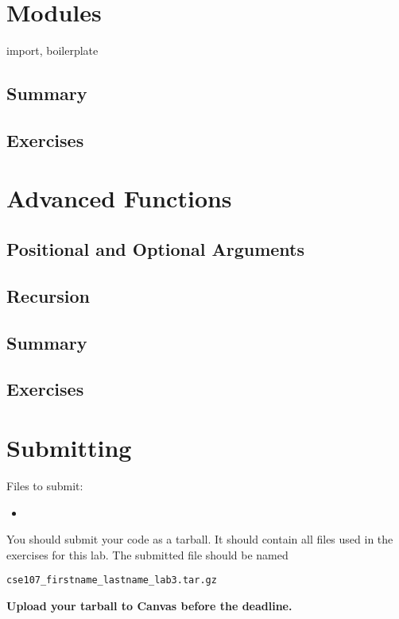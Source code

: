 \documentclass[11pt]{cselabheader}
\begin{document}
\section{Modules}
\label{sec:modules}

import, boilerplate

\subsection{Summary}
\label{subsec:modules.sum}

\subsection{Exercises}
\label{subsec:modules.ex}

\section{Advanced Functions}
\label{sec:adv}

\subsection{Positional and Optional Arguments}
\label{subsec:adv.args}

\subsection{Recursion}
\label{subsec:adv.recursion}

\subsection{Summary}
\label{subsec:adv.sum}

\subsection{Exercises}
\label{subsec:adv.ex}

\pagebreak
\section{Submitting}

Files to submit:
\begin{itemize}
  \item 
\end{itemize}

You should submit your code as a tarball. It should contain all files
used in the exercises for this lab. The submitted file should be named
\begin{center}
  \texttt{cse107\_firstname\_lastname\_lab3.tar.gz}
\end{center}

\begin{center}
  \textbf{Upload your tarball to Canvas before the deadline.}
\end{center}
\end{document}
